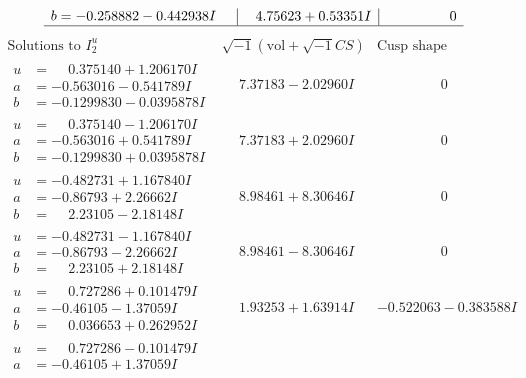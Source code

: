 \documentclass[1p]{elsarticle_modified}
\theoremstyle{definition}
\newcommand{\I}{\sqrt{-1}}
\begin{document}
$$\begin{array}{c|c|c}
\begin{aligned}
b &= -0.258882 - 0.442938 I\end{aligned}
 & \phantom{-}4.75623 + 0.53351 I & \phantom{-0.000000 } 0\\
 \hline 
 \end{array}$$\newpage$$\begin{array}{c|c|c}  
\text{Solutions to }I^u_{2}& \I (\text{vol} + \sqrt{-1}CS) & \text{Cusp shape}\\
 \hline 
\begin{aligned}
u &= \phantom{-}0.375140 + 1.206170 I \\
a &= -0.563016 - 0.541789 I \\
b &= -0.1299830 - 0.0395878 I\end{aligned}
 & \phantom{-}7.37183 - 2.02960 I & \phantom{-0.000000 } 0 \\ \hline\begin{aligned}
u &= \phantom{-}0.375140 - 1.206170 I \\
a &= -0.563016 + 0.541789 I \\
b &= -0.1299830 + 0.0395878 I\end{aligned}
 & \phantom{-}7.37183 + 2.02960 I & \phantom{-0.000000 } 0 \\ \hline\begin{aligned}
u &= -0.482731 + 1.167840 I \\
a &= -0.86793 + 2.26662 I \\
b &= \phantom{-}2.23105 - 2.18148 I\end{aligned}
 & \phantom{-}8.98461 + 8.30646 I & \phantom{-0.000000 } 0 \\ \hline\begin{aligned}
u &= -0.482731 - 1.167840 I \\
a &= -0.86793 - 2.26662 I \\
b &= \phantom{-}2.23105 + 2.18148 I\end{aligned}
 & \phantom{-}8.98461 - 8.30646 I & \phantom{-0.000000 } 0 \\ \hline\begin{aligned}
u &= \phantom{-}0.727286 + 0.101479 I \\
a &= -0.46105 - 1.37059 I \\
b &= \phantom{-}0.036653 + 0.262952 I\end{aligned}
 & \phantom{-}1.93253 + 1.63914 I & -0.522063 - 0.383588 I \\ \hline\begin{aligned}
u &= \phantom{-}0.727286 - 0.101479 I \\
a &= -0.46105 + 1.37059 I \\

\end{aligned}
\end{array}$$
\end{document}
